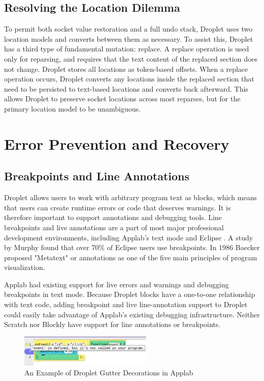 \documentclass[conference]{IEEEtran}
\begin{document}
\subsection{Resolving the Location Dilemma}
To permit both socket value restoration and a full undo stack, Droplet uses two location models and converts between them as necessary. To assist this, Droplet has a third type of fundamental mutation: replace. A replace operation is used only for reparsing, and requires that the text content of the replaced section does not change. Droplet stores all locations as token-based offsets. When a replace operation occurs, Droplet converts any locations inside the replaced section that need to be persisted to text-based locations and converts back afterward. This allows Droplet to preserve socket locations across most reparses, but for the primary location model to be unambiguous.

\section{Error Prevention and Recovery}

\subsection{Breakpoints and Line Annotations}

Droplet allows users to work with arbitrary program text as blocks, which means that users can create runtime errors or code that deserves warnings. It is therefore important to support annotations and debugging tools. Line breakpoints and live annotations are a part of most major professional development environments, including Applab's text mode and Eclipse \cite{Eclipse}. A study by Murphy \cite{Murphy} found that over 70\% of Eclipse users use breakpoints. In 1986 Baecker \cite{Baecker} proposed "Metatext" or annotations as one of the five main principles of program visualization.

Applab had existing support for live errors and warnings and debugging breakpoints in text mode. Because Droplet blocks have a one-to-one relationship with text code, adding breakpoint and live line-annotation support to Droplet could easily take advantage of Applab's existing debugging infrastructure. Neither Scratch nor Blockly have support for line annotations or breakpoints.

\begin{figure}
\centering
\includegraphics[width=2.5in]{breakpoint_annotations.png}
\caption{An Example of Droplet Gutter Decorations in Applab}
\label{breakpoints}
\end{figure}
\end{document}

